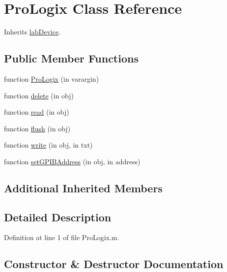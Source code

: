 \hypertarget{class_pro_logix}{}\section{Pro\+Logix Class Reference}
\label{class_pro_logix}


Inherits \hyperlink{classlab_device}{lab\+Device}.

\subsection*{Public Member Functions}
\begin{DoxyCompactItemize}
\item 
function \hyperlink{class_pro_logix_abd73d806d3875c746de0ae9d991a309a}{Pro\+Logix} (in varargin)
\item 
function \hyperlink{class_pro_logix_aac64ba77a8d1d585f7ce3babec8a7bdf}{delete} (in obj)
\item 
function \hyperlink{class_pro_logix_a9efc047bce79d9a697357687f2c1fb4f}{read} (in obj)
\item 
function \hyperlink{class_pro_logix_a08f4b1b7f78a2029bbbd1633b0a0e225}{flush} (in obj)
\item 
function \hyperlink{class_pro_logix_a930c59e82d2e13a8221951924670d3c9}{write} (in obj, in txt)
\item 
function \hyperlink{class_pro_logix_a7dbba3fc290589ebc1c4b56856849bfc}{set\+G\+P\+I\+B\+Address} (in obj, in address)
\end{DoxyCompactItemize}
\subsection*{Additional Inherited Members}


\subsection{Detailed Description}


Definition at line 1 of file Pro\+Logix.\+m.



\subsection{Constructor \& Destructor Documentation}
\mbox{\label{class_pro_logix_abd73d806d3875c746de0ae9d991a309a}} 
